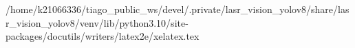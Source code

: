 /home/k21066336/tiago_public_ws/devel/.private/lasr_vision_yolov8/share/lasr_vision_yolov8/venv/lib/python3.10/site-packages/docutils/writers/latex2e/xelatex.tex